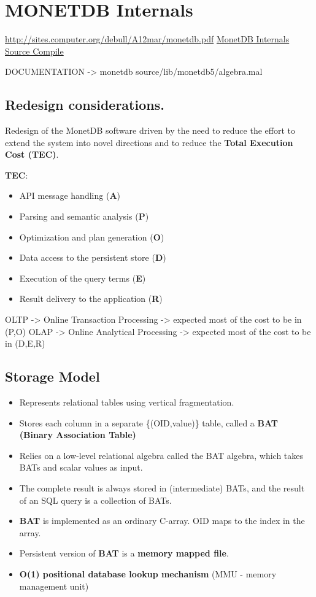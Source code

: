 \documentclass[11pt]{article}
\author{Lucas Pereira}
\date{\today}
\title{}
\begin{document}
\tableofcontents


\section{MONETDB Internals}
\label{sec:org3c139da}

\url{http://sites.computer.org/debull/A12mar/monetdb.pdf}
\href{https://www.monetdb.org/Documentation/MonetDBInternals/Overview}{MonetDB Internals}
\href{https://www.monetdb.org/Developers/SourceCompile}{Source Compile}

DOCUMENTATION -> monetdb source/lib/monetdb5/algebra.mal

\subsection{Redesign considerations.}
\label{sec:orgbb73b86}
Redesign of the MonetDB software driven by the need to reduce the effort to extend the system into novel directions and to reduce
the \textbf{Total Execution Cost (TEC)}.

\textbf{TEC}:
\begin{itemize}
\item API message handling                (\textbf{A})
\item Parsing and semantic analysis       (\textbf{P})
\item Optimization and plan generation    (\textbf{O})
\item Data access to the persistent store (\textbf{D})
\item Execution of the query terms        (\textbf{E})
\item Result delivery to the application  (\textbf{R})
\end{itemize}

OLTP -> Online Transaction Processing -> expected most of the cost to be in (P,O)
OLAP -> Online Analytical Processing  -> expected most of the cost to be in (D,E,R)

\subsection{Storage Model}
\label{sec:orgce82bda}
\begin{itemize}
\item Represents relational tables using vertical fragmentation.
\item Stores each column in a separate \{(OID,value)\} table,  called a \textbf{BAT (Binary Association Table)}
\item Relies on a low-level relational algebra called the BAT algebra, which takes BATs and scalar values as input.
\item The complete result is always stored in (intermediate) BATs, and the result of an SQL query is a collection of BATs.

\item \textbf{BAT} is implemented as an ordinary C-array. OID maps to the index in the array.
\item Persistent version of \textbf{BAT} is a \textbf{memory mapped file}.
\item \textbf{O(1) positional database lookup mechanism} (MMU - memory management unit)
\end{itemize}
\end{document}
